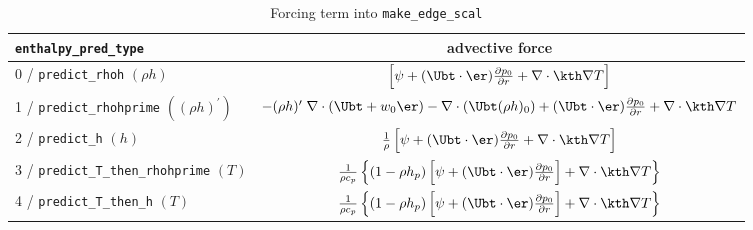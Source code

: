 \begin{table*}[h]
\centering
\caption{Forcing term into {\tt make\_edge\_scal}}
\label{table:pred:hforce}
\renewcommand{\arraystretch}{1.5}
\begin{tabular}{l|c}
\hline
\hline
{\tt enthalpy\_pred\_type} &   {advective force} \\
\hline
0 / {\tt predict\_rhoh}  $(\rho h)$ & $ \left [\psi + (\Ubt \cdot \er)
  \frac{\partial p_0}{\partial r} + \nabla \cdot \kth \nabla T \right ]$ \\
1 / {\tt predict\_rhohprime} $((\rho h)^\prime)$ &  
 $-(\rho h)^\prime \; \nabla \cdot (\Ubt+w_0 \er) - 
 \nabla \cdot (\Ubt (\rho h)_0) + (\Ubt \cdot \er) \frac{\partial p_0}{\partial r} + \nabla \cdot \kth \nabla T$ \\
2 / {\tt predict\_h}  $(h)$ & $\frac{1}{\rho} \left [\psi + (\Ubt \cdot \er)
  \frac{\partial p_0}{\partial r} + \nabla \cdot \kth \nabla T \right ]$ \\
3 / {\tt predict\_T\_then\_rhohprime} $(T)$ & $\frac{1}{\rho c_p} \left \{ (1 - \rho h_p) 
   \left [\psi + (\Ubt \cdot \er) \frac{\partial p_0}{\partial r} \right ] + \nabla \cdot \kth \nabla T \right \}$ \\
4 / {\tt predict\_T\_then\_h}  $(T)$ & $\frac{1}{\rho c_p} \left\{ (1 - \rho h_p) \left [\psi + (\Ubt \cdot \er)
\frac{\partial p_0}{\partial r}\right ] +  \nabla \cdot \kth \nabla T \right\}$ \\
\hline
\end{tabular}
\end{table*}


